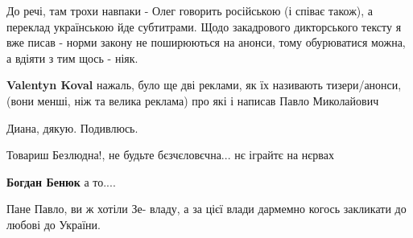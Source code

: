 \begin{itemize}
\begin{itemize}
До речі, там трохи навпаки - Олег говорить російською (і співає також), а
переклад українською йде субтитрами. Щодо закадрового дикторського тексту я вже
писав - норми закону не поширюються на анонси, тому обурюватися можна, а вдіяти
з тим щось - ніяк.


 
\textbf{Valentyn Koval} нажаль, було ще дві реклами, як їх називають
тизери/анонси, (вони менші, ніж та велика реклама) про які і написав Павло
Миколайович

 
Диана, дякую. Подивлюсь.
\end{itemize}

 
Товариш Безлюдна!, не будьте бєзчєловєчна... нє іграйтє на нєрвах

\begin{itemize}
 
\textbf{Богдан Бенюк} а то....
\end{itemize}

 
Пане Павло, ви ж хотіли Зе- владу, а за цієї влади дармемно когось закликати до любові до України.

 


\end{itemize}
